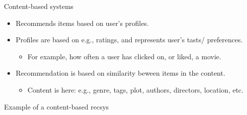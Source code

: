 \documentclass[compress]{beamer}
\begin{document}
\begin{frame}
\begin{block}{Content-based systems}
	\begin{itemize}
		\item <1-> Recommends items based on user's profiles. 
		\item <2-> Profiles are based on e.g., ratings, and represents user's tasts/ preferences. 
		\begin{itemize}
			\item <3-> For example, how often a user has clicked on, or liked, a movie. 
		\end{itemize}
		\item <4-> Recommendation is based on \alert{similarity} beween items in the content.
		\begin{itemize}
			\item <5-> Content is here: e.g., genre, tags, plot, authors, directors, location, etc. 
		\end{itemize}
	\end{itemize}
\end{block}
\end{frame}

\begin{frame}{Example of a content-based recsys}
\end{frame}
\end{document}
